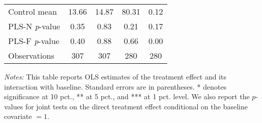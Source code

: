 \begin{table}[ht]
{\begin{threeparttable}
\begin{tabular}{l*{4}{c}}
Control mean    &    13.66         &    14.87         &    80.31         &     0.12         \\
PLS-N \emph{p}-value&     0.35         &     0.83         &     0.21         &     0.17         \\
PLS-F \emph{p}-value&     0.40         &     0.88         &     0.66         &     0.00         \\
Observations    &      307         &      307         &      280         &      280         \\
\bottomrule \end{tabular} \begin{tablenotes}[flushleft] \footnotesize \item \emph{Notes:} This table reports OLS estimates of the treatment effect and its interaction with baseline. Standard errors are in parentheses. * denotes significance at 10 pct., ** at 5 pct., and *** at 1 pct. level. We also report the \(p\)-values for joint tests on the direct treatment effect conditional on the baseline covariate $= 1$. \end{tablenotes} \end{threeparttable} } \end{table}

